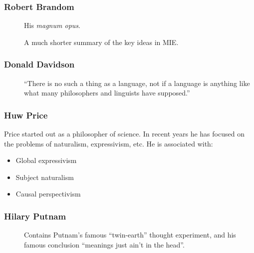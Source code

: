 \documentclass[11pt,twoside]{article}
\begin{document}
\begin{appendices}
\subsubsection{Robert Brandom}
\begin{description}
\item [\cite*{brandom_mie}]  His \textit{magnum opus}.
\item [\cite*{brandom_articulating_2001}] A much shorter summary of the key ideas in MIE.
\item [\cite*{brandom_perspectives_2011}]
\item [\cite*{brandom_classical_2011}]
\item [\cite*{brandom_analyzing_2011}]
\end{description}

\subsubsection{Donald Davidson}
\begin{description}
\item [\cite*{davidson_nice_2005}] ``There is no such a thing as a
  language, not if a language is anything like what many philosophers
  and linguists have supposed.''
\end{description}

\subsubsection{Huw Price}

Price started out as a philosopher of science.  In recent years he has
focused on the problems of naturalism, expressivism, etc.  He is
associated with:

\begin{itemize}
\item Global expressivism
\item Subject naturalism
\item Causal perspectivism
\end{itemize}

\begin{description}
\item [\cite*{price_expressivism_2013}]
\item [\cite*{price_naturalism_2013}]
\item [\cite*{price_pluralism_2013}]
\end{description}

\subsubsection{Hilary Putnam}
\begin{description}
\item [\cite*{putnam_meaning_1975}] Contains Putnam's famous
  ``twin-earth'' thought experiment, and his famous conclusion
  ``meanings just ain't in the head''.
\item [\cite*{putnam_pragmatism_1995}]
\end{description}


\end{appendices}
\end{document}
